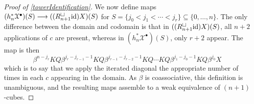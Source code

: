 \documentclass[11pt]{amsart} \renewcommand{\baselinestretch}{1.4}
\theoremstyle{plain}
\theoremstyle{definition}
\renewcommand{\to}{\longrightarrow}
\newcommand{\calx}{\mathcal{X}}
\newcommand{\Id}{\mathrm{id}}
\newcommand{\plainD}{R}
\begin{document}
\begin{Bousfield-Kan spectral sequence}
\begin{proof}[Proof of \ref{towerIdentification}]
We now define maps $(h_n^*\calx^\bullet)(S)\to (({\plainD}_{n+1}^{\smash{\square}}\Id )X)(S)$ for $S=\{j_0<j_1<\cdots<j_r\}\subseteq\{0,\ldots,n\}$. 
The only difference between the domain and codomain is that in $(({\plainD}_{n+1}^{\smash{\square}}\Id )X)(S)$, all $n+2$ applications of $c$ are present, whereas in $(h_n^*\calx^\bullet)(S)$, only $r+2$ appear. The map is then
\[\beta^{n-j_r}KQ\beta^{j_r-j_{r-1}-1}KQ\beta^{j_{r-1}-j_{r-2}-1}KQ\cdots KQ\beta^{j_{1}-j_0-1}KQ\beta^{j_0}X\]
which is to say that we apply the iterated diagonal the appropriate number of times in each $c$ appearing in the domain. As $\beta$ is coassociative, this definition is unambiguous, and the resulting maps assemble to a weak equivalence of $(n+1)$-cubes. 
\end{proof}




\end{Bousfield-Kan spectral sequence}
\end{document}
